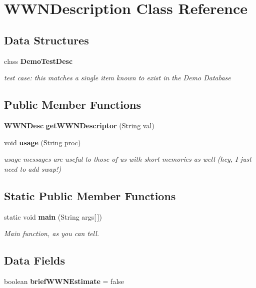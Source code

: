 \section{\-W\-W\-N\-Description \-Class \-Reference}
\label{classorg_1_1smallfoot_1_1wwn_1_1WWNDescription}
\subsection*{\-Data \-Structures}
\begin{DoxyCompactItemize}
\item 
class {\bf \-Demo\-Test\-Desc}
\begin{DoxyCompactList}\small\item\em test case\-: this matches a single item known to exist in the \-Demo \-Database \end{DoxyCompactList}\end{DoxyCompactItemize}
\subsection*{\-Public \-Member \-Functions}
\begin{DoxyCompactItemize}
\item 
{\bf \-W\-W\-N\-Desc} {\bf get\-W\-W\-N\-Descriptor} (\-String val)
\item 
void {\bf usage} (\-String proc)
\begin{DoxyCompactList}\small\item\em usage messages are useful to those of us with short memories as well (hey, \-I just need to add swap!) \end{DoxyCompactList}\end{DoxyCompactItemize}
\subsection*{\-Static \-Public \-Member \-Functions}
\begin{DoxyCompactItemize}
\item 
static void {\bf main} (\-String args[$\,$])
\begin{DoxyCompactList}\small\item\em \-Main function, as you can tell. \end{DoxyCompactList}\end{DoxyCompactItemize}
\subsection*{\-Data \-Fields}
\begin{DoxyCompactItemize}
\item 
boolean {\bf brief\-W\-W\-N\-Estimate} = false
\end{DoxyCompactItemize}


